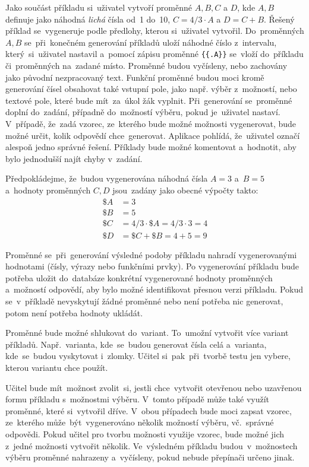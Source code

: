 \documentclass[11pt,a4paper]{report}
\begin{document}
            Jako součást příkladu si~uživatel vytvoří proměnné $A, B, C$ a $D$, kde $A, B$ definuje jako náhodná \emph{lichá} čísla od~1 do~10, $C = 4/3\cdot{A}$ a $D = C + B$. Řešený příklad se~vygeneruje podle předlohy, kterou si~uživatel vytvořil. Do~proměnných $A, B$ se~při~konečném generování příkladů uloží náhodné číslo z~intervalu, který~si~uživatel nastavil a~pomocí zápisu proměnné \texttt{\{\{.A\}\}} se~vloží do~příkladu či~proměnných na~zadané místo. Proměnné budou vyčísleny, nebo zachovány jako původní nezpracovaný text. Funkční proměnné budou moci kromě generování čísel obsahovat také vstupní pole, jako např. výběr z~možností, nebo textové pole, které bude mít~za~úkol žák vyplnit. Při~generování se~proměnné doplní do~zadání, případně do~možností výběru, pokud je~uživatel nastaví. V~případě, že~zadá vzorec, ze~kterého bude možné možnosti vygenerovat, bude možné určit, kolik odpovědí chce~generovat. Aplikace pohlídá, že~uživatel označí alespoň jedno správné řešení. Příklady bude možné komentovat a~hodnotit, aby bylo jednodušší najít chyby v~zadání.
            
            Předpokládejme, že~budou vygenerována náhodná čísla $A = 3$ a~$B = 5$ a~hodnoty proměnných $C, D$ jsou~zadány jako obecné výpočty takto:
            \begin{align*}
                \$A &= 3 \\
                \$B &= 5 \\
                \$C &= 4/3 \cdot \$A = 4/3 \cdot 3 = 4 \\
                \$D &= \$C + \$B = 4 + 5 = 9
            \end{align*}

            Proměnné se~při~generování výsledné podoby příkladu nahradí vygenerovanými hodnotami (čísly, výrazy nebo funkčními prvky). Po vygenerování příkladu bude potřeba uložit do~databáze konkrétní vygenerované hodnoty proměnných a~možností odpovědí, aby bylo možné identifikovat přesnou verzi příkladu. Pokud se~v~příkladě nevyskytují žádné proměnné nebo není potřeba nic generovat, potom není potřeba hodnoty ukládát.

            Proměnné bude možné shlukovat do~variant. To~umožní vytvořit více variant příkladů. Např.~varianta, kde~se~budou generovat čísla celá a~varianta, kde~se~budou vyskytovat i~zlomky. Učitel si~pak~při~tvorbě testu jen vybere, kterou variantu chce použít.

            Učitel bude mít~možnost zvolit~si, jestli chce~vytvořit otevřenou nebo uzavřenou formu příkladu s~možnostmi výběru. V~tomto případě může také využít proměnné, které si~vytvořil dříve. V~obou případech bude moci zapsat vzorec, ze~kterého může~být~vygenerováno několik možností výběru, vč.~správné odpovědi. Pokud učitel pro tvorbu možnosti využije vzorec, bude možné jich z~jedné možnosti vytvořit několik. Ve~výsledném příkladu budou~v~možnostech výběru proměnné nahrazeny a~vyčísleny, pokud nebude přepínači určeno jinak.
\end{document}
